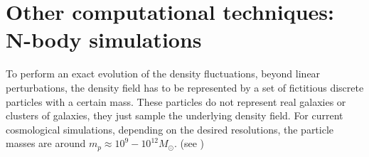 %
%
%
%
%
%


\section{Other computational techniques: N-body simulations \label{sec:Computational}}

To perform an exact evolution of the density fluctuations, beyond
linear perturbations, the density field has to be represented by a
set of fictitious discrete particles with a certain mass. These particles
do not represent real galaxies or clusters of galaxies, they just
sample the underlying density field. For current cosmological simulations,
depending on the desired resolutions, the particle masses are around
$m_{p}\approx10^{9}-10^{12}M_{\odot}$. (see \citet{kuhlen_numerical_2012})

